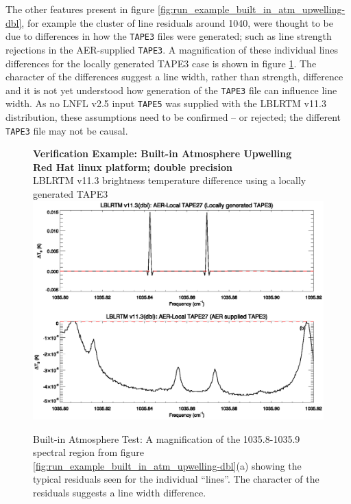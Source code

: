 The other features present in figure \ref{fig:run_example_built_in_atm_upwelling-dbl}, for example the cluster of line residuals around 1040\invcm{}, were thought to be due to differences in how the \texttt{TAPE3} files were generated; such as line strength rejections in the AER-supplied \texttt{TAPE3}. A magnification of these individual lines differences for the locally generated TAPE3 case is shown in figure \ref{fig:run_example_built_in_atm_upwelling-dbl_1035.8-1035.9}. The character of the differences suggest a line width, rather than strength, difference and it is not yet understood how generation of the \texttt{TAPE3} file can influence line width. As no LNFL v2.5 input \texttt{TAPE5} was supplied with the LBLRTM v11.3 distribution, these assumptions need to be confirmed -- or rejected; the different \texttt{TAPE3} file may not be causal.

\begin{figure}[htp]
  \centering
  \qquad\sffamily\textbf{Verification Example: Built-in Atmosphere Upwelling}\\
  \qquad\sffamily\textbf{Red Hat linux platform; double precision}\\
  \qquad\textsf{LBLRTM v11.3 brightness temperature difference using a locally generated TAPE3}\\
  \includegraphics[bb=85 403 534 558,clip,scale=1.0]{graphics/run_example_built_in_atm_upwelling/dbl_1035.8-1035.9.eps}
  \caption{Built-in Atmosphere Test: A magnification of the 1035.8-1035.9\invcm{} spectral region from figure \ref{fig:run_example_built_in_atm_upwelling-dbl}(a) showing the typical residuals seen for the individual ``lines''. The character of the residuals suggests a line width difference.}
  \label{fig:run_example_built_in_atm_upwelling-dbl_1035.8-1035.9}
\end{figure}

